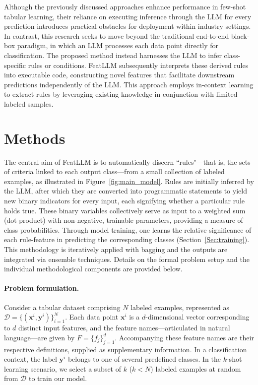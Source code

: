 Although the previously discussed approaches enhance performance in few-shot tabular learning, their reliance on executing inference through the LLM for every prediction introduces practical obstacles for deployment within industry settings. In contrast, this research seeks to move beyond the traditional end-to-end black-box paradigm, in which an LLM processes each data point directly for classification. The proposed method instead harnesses the LLM to infer class-specific rules or conditions. \textsf{FeatLLM} subsequently interprets these derived rules into executable code, constructing novel features that facilitate downstream predictions independently of the LLM. This approach employs in-context learning to extract rules by leveraging existing knowledge in conjunction with limited labeled samples.

\section{Methods}
The central aim of \textsf{FeatLLM} is to automatically discern ``rules"—that is, the sets of criteria linked to each output class—from a small collection of labeled examples, as illustrated in Figure~\ref{fig:main_model}. Rules are initially inferred by the LLM, after which they are converted into programmatic statements to yield new binary indicators for every input, each signifying whether a particular rule holds true. These binary variables collectively serve as input to a weighted sum (dot product) with non-negative, trainable parameters, providing a measure of class probabilities. Through model training, one learns the relative significance of each rule-feature in predicting the corresponding classes (Section~\ref{Sec:training}). This methodology is iteratively applied with bagging and the outputs are integrated via ensemble techniques. Details on the formal problem setup and the individual methodological components are provided below.

\vspace*{-0.12in}
\paragraph{Problem formulation.} Consider a tabular dataset comprising $N$ labeled examples, represented as $\mathcal{D} = \{(\mathbf{x}^i, \mathbf{y}^i)\}_{i=1}^{N}$. Each data point $\mathbf{x}^i$ is a $d$-dimensional vector corresponding to $d$ distinct input features, and the feature names—articulated in natural language—are given by $F = \{f_j\}_{j=1}^{d}$. Accompanying these feature names are their respective definitions, supplied as supplementary information. In a classification context, the label $\mathbf{y}^i$ belongs to one of several predefined classes. In the $k$-shot learning scenario, we select a subset of $k$ ($k < N$) labeled examples at random from $\mathcal{D}$ to train our model.

